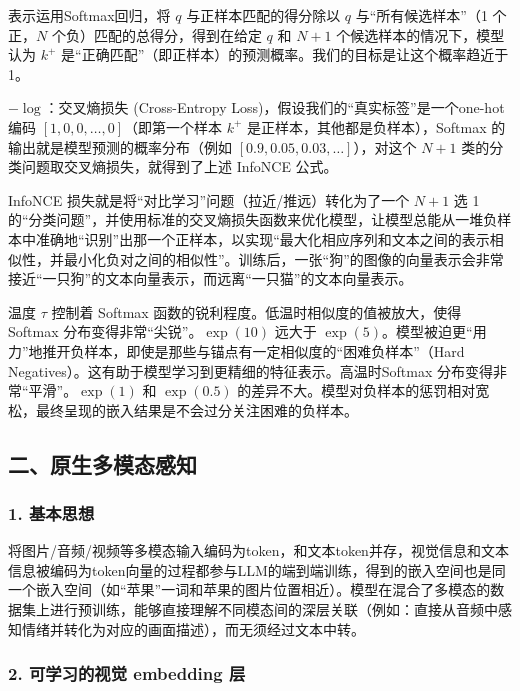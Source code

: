 表示运用Softmax回归，将 \(q\) 与正样本匹配的得分除以 \(q\) 与``所有候选样本''（1 个正，\(N\) 个负）匹配的总得分，得到在给定 \(q\) 和 \(N+1\) 个候选样本的情况下，模型认为 \(k^+\) 是``正确匹配''（即正样本）的预测概率。我们的目标是让这个概率趋近于 1。

\(-\log\)：交叉熵损失 (Cross-Entropy Loss)，假设我们的``真实标签''是一个one-hot编码 \([1,0,0,\ldots,0]\)（即第一个样本 \(k^+\) 是正样本，其他都是负样本），Softmax 的输出就是模型预测的概率分布（例如 \([0.9,0.05,0.03,\ldots]\)），对这个 \(N+1\) 类的分类问题取交叉熵损失，就得到了上述 InfoNCE 公式。

InfoNCE 损失就是将``对比学习''问题（拉近/推远）转化为了一个 \(N+1\) 选 1 的``分类问题''，并使用标准的交叉熵损失函数来优化模型，让模型总能从一堆负样本中准确地``识别''出那一个正样本，以实现``最大化相应序列和文本之间的表示相似性，并最小化负对之间的相似性''。训练后，一张``狗''的图像的向量表示会非常接近``一只狗''的文本向量表示，而远离``一只猫''的文本向量表示。

温度 \(\tau\) 控制着 Softmax 函数的锐利程度。低温时相似度的值被放大，使得 Softmax 分布变得非常``尖锐''。\(\exp(10)\) 远大于 \(\exp(5)\)。模型被迫更``用力''地推开负样本，即使是那些与锚点有一定相似度的``困难负样本''（Hard Negatives）。这有助于模型学习到更精细的特征表示。高温时Softmax 分布变得非常``平滑''。\(\exp(1)\) 和 \(\exp(0.5)\) 的差异不大。模型对负样本的惩罚相对宽松，最终呈现的嵌入结果是不会过分关注困难的负样本。

\hypertarget{ux4e8cux539fux751fux591aux6a21ux6001ux611fux77e5}{%
\subsection{二、原生多模态感知}\label{ux4e8cux539fux751fux591aux6a21ux6001ux611fux77e5}}

\hypertarget{ux57faux672cux601dux60f3-1}{%
\subsubsection{1. 基本思想}\label{ux57faux672cux601dux60f3-1}}

将图片/音频/视频等多模态输入编码为token，和文本token并存，视觉信息和文本信息被编码为token向量的过程都参与LLM的端到端训练，得到的嵌入空间也是同一个嵌入空间（如``苹果''一词和苹果的图片位置相近）。模型在混合了多模态的数据集上进行预训练，能够直接理解不同模态间的深层关联（例如：直接从音频中感知情绪并转化为对应的画面描述），而无须经过文本中转。

\hypertarget{ux53efux5b66ux4e60ux7684ux89c6ux89c9-embedding-ux5c42}{%
\subsubsection{2. 可学习的视觉 embedding 层}\label{ux53efux5b66ux4e60ux7684ux89c6ux89c9-embedding-ux5c42}}

